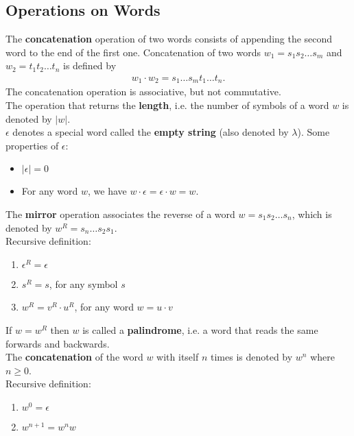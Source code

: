 \subsection{Operations on Words}
The \textbf{concatenation} operation of two words consists of 
appending the second word to the end of the first one.
Concatenation of two words $ w_1 = s_1 s_2\dots s_m $ 
and $w_2 = t_1 t_2 \dots t_n$ is defined by
\begin{align*}
w_1 \cdot w_2 = s_1 \dots s_m t_1 \dots t_n.
\end{align*}
The concatenation operation is associative, but not commutative.\\

The operation that returns the \textbf{length}, i.e. 
the number of symbols of a word $w$ is denoted by $|w|$.\\

$\epsilon$ denotes a special word called the \textbf{empty string} 
(also denoted by $\lambda$). Some properties of $\epsilon$:
\begin{itemize}
  \item $|\epsilon| = 0$
  \item For any word $w$, we have $w \cdot \epsilon = \epsilon \cdot w = w$.
\end{itemize}

The \textbf{mirror} operation associates the reverse of a word $w = s_1 s_2 \dots s_n$,
which is denoted by $ w^R = s_n \dots s_2 s_1$.\\

Recursive definition:
\begin{enumerate}
  \item $\epsilon^R = \epsilon$
  \item $s^R = s$, for any symbol $s$
  \item $w^R = v^R \cdot u^R$, for any word $w =  u \cdot v$
\end{enumerate}

If $w = w^R$ then $w$ is called a 
\textbf{palindrome}, i.e. a word that reads the same forwards and backwards.\\

The \textbf{concatenation} of the word $w$ with itself $n$ times is denoted by $w^n$ where $n \geq 0$.\\

Recursive definition:
\begin{enumerate}
  \item $w^0 = \epsilon$
  \item $w^{n+1} = w^{n}w$
\end{enumerate}

